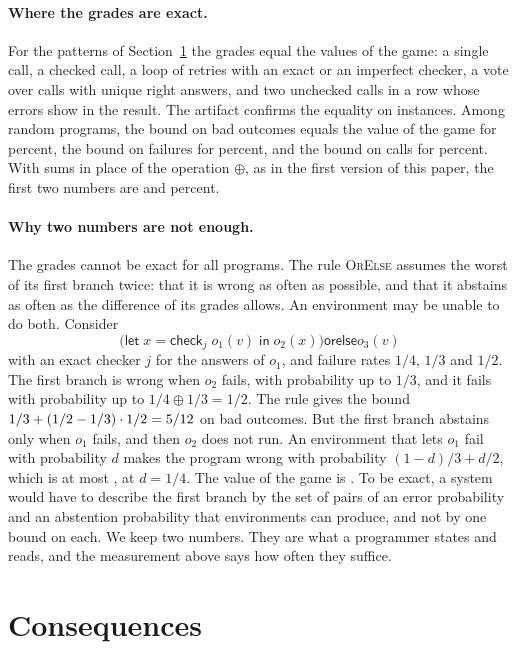\documentclass[acmsmall,nonacm,screen]{acmart}
\newcommand{\kw}[1]{\mathsf{#1}}
\newcommand{\letin}[3]{\kw{let}\;#1 = #2\;\kw{in}\;#3}
\newcommand{\chk}[2]{\kw{check}_{#1}\;#2}
\newcommand{\orelse}{\mathbin{\kw{orelse}}}
\begin{document}
\paragraph{Where the grades are exact.} For the patterns of Section~\ref{sec:consequences}
the grades equal the values of the game: a single call, a checked call, a loop of retries
with an exact or an imperfect checker, a vote over calls with unique right answers, and two
unchecked calls in a row whose errors show in the result. The artifact confirms the equality
on \exCases{} instances. Among \exPrograms{} random programs, the bound on bad outcomes
equals the value of the game for \exTightBad{} percent, the bound on failures for
\exTightFail{} percent, and the bound on calls for \exTightCost{} percent. With sums in place
of the operation $\oplus$, as in the first version of this paper, the first two numbers are
\exUnionBad{} and \exUnionFail{} percent.

\paragraph{Why two numbers are not enough.} The grades cannot be exact for all programs. The
rule \textsc{OrElse} assumes the worst of its first branch twice: that it is wrong as often
as possible, and that it abstains as often as the difference of its grades allows. An
environment may be unable to do both. Consider
\[
\bigl(\letin{x}{\chk{j}{o_1(v)}}{o_2(x)}\bigr) \orelse o_3(v)
\]
with an exact checker $j$ for the answers of $o_1$, and failure rates $1/4$, $1/3$ and $1/2$.
The first branch is wrong when $o_2$ fails, with probability up to $1/3$, and it fails with
probability up to $1/4 \oplus 1/3 = 1/2$. The rule gives the bound
$1/3 + (1/2 - 1/3) \cdot 1/2 = 5/12$ on bad outcomes. But the first branch abstains
only when $o_1$ fails, and then $o_2$ does not run. An environment that lets $o_1$ fail with
probability $d$ makes the program wrong with probability $(1 - d)/3 + d/2$, which is at most
\exGapExact{}, at $d = 1/4$. The value of the game is \exGapExact{}. To be exact, a system
would have to describe the first branch by the set of pairs of an error probability and an
abstention probability that environments can produce, and not by one bound on each. We keep
two numbers. They are what a programmer states and reads, and the measurement above says how
often they suffice.

\section{Consequences}
\label{sec:consequences}
\end{document}
